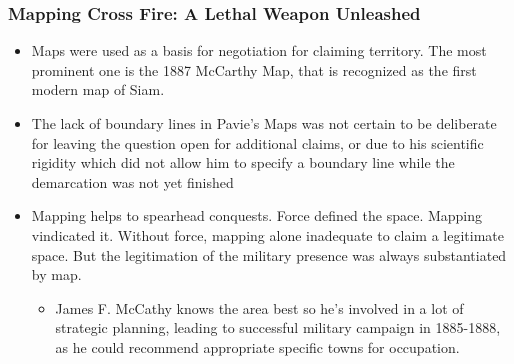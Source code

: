 \documentclass[a4paper]{article}
\begin{document}
\subsubsection{Mapping Cross Fire: A Lethal Weapon Unleashed}
\begin{itemize}
	\item Maps were used as a basis for negotiation for claiming territory. The most prominent one is the 1887 McCarthy Map, that is recognized as the first modern map of Siam.
	\item The lack of boundary lines in Pavie's Maps was not certain to be deliberate for leaving the question open for additional claims, or due to his scientific rigidity which did not allow him to specify a boundary line while the demarcation was not yet finished
	\item Mapping helps to spearhead conquests. Force defined the space. Mapping vindicated it. Without force, mapping alone inadequate to claim a legitimate space. But the legitimation of the military presence was always substantiated by map. 
	\begin{itemize}[label=$\circ$]
		\item James F. McCathy knows the area best so he's involved in a lot of strategic planning, leading to successful military campaign in 1885-1888, as he could recommend appropriate specific towns for occupation.
	\end{itemize}
\end{itemize}
\end{document}
